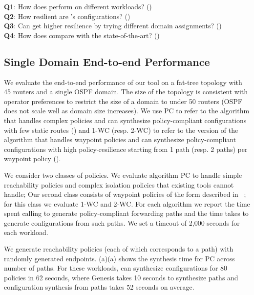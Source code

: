 \vspace{2mm}
\noindent\textbf{Q1}: How does \name perform on different  workloads? ()\\
\noindent\textbf{Q2}: How resilient are \name's  configurations? ()\\
\noindent\textbf{Q3}: Can \name get higher resilience by trying different domain assignments? ()\\
\noindent\textbf{Q4}: How does \name compare with the state-of-the-art? ()



\subsection{Single Domain End-to-end Performance}\label{sec:ospfeval}


We evaluate the end-to-end performance of our tool
on a  fat-tree 
topology with 45 routers
and a single OSPF domain. 
The size of the topology is consistent with operator preferences to restrict
the size of a domain to under 50 routers (OSPF does not scale
well as domain size increases).
We use PC to refer to the algorithm that handles complex policies and
can synthesize policy-compliant
configurations with few static routes ()
and 
1-WC (resp. 2-WC) to refer to the version of  the algorithm that handles waypoint policies and
can synthesize policy-compliant
configurations with high policy-resilience starting from 1 path (resp. 2 paths) per waypoint policy ().

We consider two classes of policies. 
We evaluate algorithm PC to handle simple
reachability policies and complex isolation policies that 
existing tools cannot handle; 
Our second class consists of
 waypoint policies of the form described in ~;
for this class we evaluate 1-WC and 2-WC.
For each algorithm we report the time spent 
calling \genesis to generate policy-compliant forwarding paths
and the time \name takes to generate configurations 
from such paths. 
We set a timeout of 2,000 seconds for each workload.

We generate reachability policies (each of which 
corresponds to a path) with randomly generated endpoints.
(a)(a) shows the synthesis time for
PC across number of paths. 
For these workloads, \name can
synthesize configurations for 80 policies in 62 
seconds, where Genesis takes 10 seconds to synthesize paths 
and configuration synthesis from paths 
takes 52 seconds on average.

